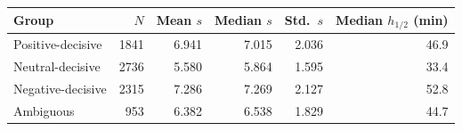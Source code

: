 \begin{tabular}{lrrrrr}
\toprule
Group & $N$ & Mean $s$ & Median $s$ & Std.\ $s$ & Median $h_{1/2}$ (min) \\
\midrule
Positive-decisive & 1841 & 6.941 & 7.015 & 2.036 & 46.9 \\
Neutral-decisive & 2736 & 5.580 & 5.864 & 1.595 & 33.4 \\
Negative-decisive & 2315 & 7.286 & 7.269 & 2.127 & 52.8 \\
Ambiguous & 953 & 6.382 & 6.538 & 1.829 & 44.7 \\
\bottomrule
\end{tabular}
